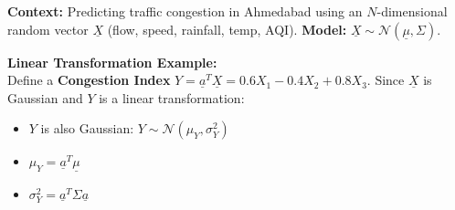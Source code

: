 \documentclass{article}
\renewcommand{\vec}[1]{\underline{#1}}
\begin{document}
\textbf{Context:} Predicting traffic congestion in Ahmedabad using an $N$-dimensional random vector $\vec{X}$ (flow, speed, rainfall, temp, AQI).
\textbf{Model:} $\vec{X} \sim \mathcal{N}(\vec{\mu}, \Sigma)$. 

\textbf{Linear Transformation Example:} \\
Define a \textbf{Congestion Index} $Y = \vec{a}^T \vec{X} = 0.6X_1 - 0.4X_2 + 0.8X_3$.
Since $\vec{X}$ is Gaussian and $Y$ is a linear transformation:
\begin{itemize}
    \item $Y$ is also Gaussian: $Y \sim \mathcal{N}(\mu_Y, \sigma_Y^2)$
    \item $\mu_Y = \vec{a}^T \vec{\mu}$
    \item $\sigma_Y^2 = \vec{a}^T \Sigma \vec{a}$
\end{itemize}
\end{document}
